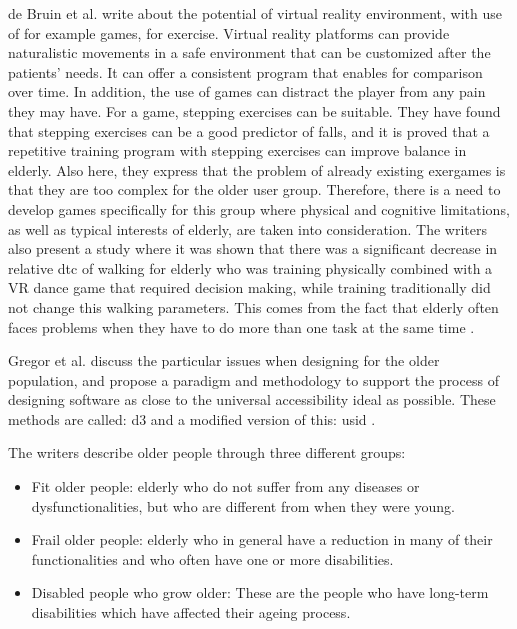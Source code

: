 de Bruin et al. \cite{bruin} write about the potential of virtual reality environment, with use of for example games, for exercise. Virtual reality platforms can provide naturalistic movements in a safe environment that can be customized after the patients' needs. It can offer a consistent program that enables for comparison over time. In addition, the use of games can distract the player from any pain they may have. For a game, stepping exercises can be suitable. They have found that stepping exercises can be a good predictor of falls, and it is proved that a repetitive training program with stepping exercises can improve balance in elderly. Also here, they express that the problem of already existing exergames is that they are too complex for the older user group. Therefore, there is a need to develop games specifically for this group where physical and cognitive limitations, as well as typical interests of elderly, are taken into consideration. The writers also present a study where it was shown that there was a significant decrease in relative \ac{dtc} of walking for elderly who was training physically combined with a VR dance game that required decision making, while training traditionally did not change this walking parameters. This comes from the fact that elderly often faces problems when they have to do more than one task at the same time \cite{bruin}.

Gregor et al. \cite{gregor} discuss the particular issues when designing for the older population, and propose a paradigm and methodology to support the process of designing software as close to the universal accessibility ideal as possible. These methods are called: \ac{d3} and a modified version of this: \ac{usid} \cite{gregor}.

The writers describe older people through three different groups:
\begin{itemize}
\item Fit older people: elderly who do not suffer from any diseases or dysfunctionalities, but who are different from when they were young.
\item Frail older people: elderly who in  general have a reduction in many of their functionalities and who often have one or more disabilities.
\item Disabled people who grow older: These are the people who have long-term disabilities which have affected their ageing process.
\end{itemize}

